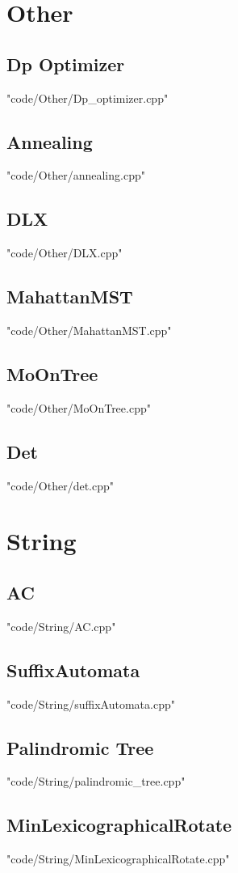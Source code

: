 \documentclass [8pt,a4paper,twocolumn]{article}
\begin{document}
\section{Other}
\subsection{Dp Optimizer}
 {"code/Other/Dp_optimizer.cpp"}
\subsection{Annealing}
 {"code/Other/annealing.cpp"}
\subsection{DLX}
 {"code/Other/DLX.cpp"}
\subsection{MahattanMST}
 {"code/Other/MahattanMST.cpp"}
\subsection{MoOnTree}
 {"code/Other/MoOnTree.cpp"}
\subsection{Det}
 {"code/Other/det.cpp"}
\section{String}
\subsection{AC}
 {"code/String/AC.cpp"}
\subsection{SuffixAutomata}
 {"code/String/suffixAutomata.cpp"}
\subsection{Palindromic Tree}
 {"code/String/palindromic_tree.cpp"}
\subsection{MinLexicographicalRotate}
 {"code/String/MinLexicographicalRotate.cpp"}
\end{document}
